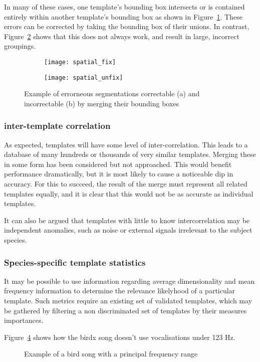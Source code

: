 In many of these cases, one template's bounding box intersects or is contained
entirely within another template's bounding box as shown in
Figure~\ref{fig:segment_intersect_a}.
These errors can be corrected by taking the bounding box of their unions.
In contrast, Figure~\ref{fig:segment_intersect_b} shows that this does not always
work, and result in large, incorrect groupings.

\begin{figure}[!htb]
  \centering
  \begin{subfigure}[h]{0.5\textwidth}
    \centering
    \texttt{[image: spatial\_fix]}
    \caption{}\label{fig:segment_intersect_a}
  \end{subfigure}%
  \begin{subfigure}[h]{0.5\textwidth}
    \centering
    \texttt{[image: spatial\_unfix]}
    \caption{}\label{fig:segment_intersect_b}
  \end{subfigure}
  \caption{Example of errorneous segmentations correctable (a) and incorrectable (b)
  by merging their bounding boxes}
  \label{fig:segment_intersect}
\end{figure}

\subsubsection{inter-template correlation}
As expected, templates will have some level of inter-correlation.
This leads to a database of many hundreds or thousands of very similar templates.
Merging these in some form has been considered but not approached.
This would benefit performance dramatically, but it is most likely to cause
a noticeable dip in accuracy.
For this to succeed, the result of the merge must represent all related templates
equally, and it is clear that this would not be as accurate as individual
templates.

It can also be argued that templates with little to know intercorrelation may be
independent anomalies, such as noise or external signals irrelevant to the
subject species.

\subsubsection{Species-specific template statistics}
It may be possible to use information regarding average dimensionality and mean
frequency information to determine the relevance likelyhood of a particular template.
Such metrics require an existing set of validated templates, which may be gathered
by filtering a non discriminated set of templates by their measures importances.

Figure~\ref{fig:bandlimit} shows how the birdx song doesn't use vocalisations
under 123 Hz.

\begin{figure}[!htb]
  \centering
  \caption{Example of a bird song with a principal frequency range}
  \label{fig:bandlimit}
\end{figure}
